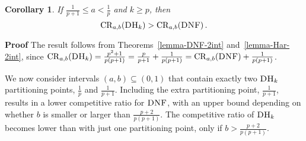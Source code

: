 \documentclass[11pt]{article}
\newtheorem{xcorollary}{Corollary}
\newenvironment{corollary}{\begin{xcorollary}\rm}{\end{xcorollary}}
\newenvironment{proof}{\begin{trivlist}\item[]{\bf Proof }}{\hspace*{\fill}\raisebox{-1pt}{\boldmath$\Box$}\end{trivlist}}
\newcommand{\DNF}{\ensuremath{\operatorname{\textsc{DNF}}}\xspace}
\newcommand{\DHk}{{\ensuremath{\textsc{DH}_k}}\xspace}
\newcommand{\CRab}[1]{\ensuremath{\mathrm{CR}_{a,b}(#1)}\xspace}
\newcommand{\p}{p}
\begin{document}
\begin{corollary}
\label{corollary-2int}
 If $\frac{1}{\p+1}\leq a < \frac{1}{\p}$ and $k \geq \p$, then $$\CRab{\DHk} > \CRab{\DNF}\,.$$
\end{corollary}
\begin{proof}
 The result follows from Theorems~\ref{lemma-DNF-2int} and~\ref{lemma-Har-2int},
since $\CRab{\DHk} = \frac{\p^2+1}{\p(\p+1)} = \frac{\p}{\p+1} + \frac{1}{\p(\p+1)} = \CRab{\DNF} + \frac{1}{\p(\p+1)}$.
\end{proof}

We now consider intervals $(a,b)\subseteq
(0,1)$ that contain exactly two \DHk partitioning points,
 $\frac{1}{\p}$ and $\frac{1}{\p+1}$.
Including the extra partitioning point, $\frac{1}{\p+1}$, results in a
 lower competitive ratio for \DNF, with an upper bound depending on whether
 $b$ is smaller or larger than $\frac{\p+2}{\p(\p+1)}$.
The competitive ratio of \DHk becomes lower than with just one
partitioning point, only if $b > \frac{\p+2}{\p(\p+1)}$.
\end{document}
